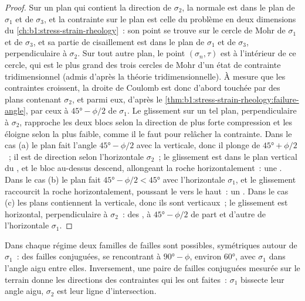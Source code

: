 \begin{proof}
Sur un plan qui contient la direction de $\sigma_2$, la normale est dans le
plan de $\sigma_1$ et de $\sigma_3$, et la contrainte sur le plan est celle du
problème en deux dimensions du \cref{ch:b1:stress-strain-rheology}~: son point
se trouve sur le cercle de Mohr de $\sigma_1$ et de $\sigma_3$, et sa partie de cisaillement est
dans le plan de $\sigma_1$ et de $\sigma_3$, perpendiculaire à $\sigma_2$. Sur tout
autre plan, le point $(\sigma_n, \tau)$ est à l'intérieur de ce cercle, qui est
le plus grand des trois cercles de Mohr d'un état de contrainte tridimensionnel
(admis d'après la théorie tridimensionnelle). À mesure que les contraintes croissent, la droite
de Coulomb est donc d'abord touchée par des plans contenant $\sigma_2$, et parmi
eux, d'après le \cref{thm:b1:stress-strain-rheology:failure-angle}, par ceux à
$\ang{45} - \phi/2$ de $\sigma_1$. Le glissement sur un tel plan, perpendiculaire à
$\sigma_2$, rapproche les deux blocs selon la direction de plus forte
compression et les éloigne selon la plus faible, comme il le faut pour relâcher la
contrainte. Dans le cas (a) le plan fait l'angle $\ang{45} - \phi/2$ avec la
verticale, donc il plonge de $\ang{45} + \phi/2$~; il est de direction selon l'horizontale
$\sigma_2$~; le glissement est dans le plan vertical du , et le bloc au-dessus
descend, allongeant la roche horizontalement~: une . Dans le cas (b) le
plan fait $\ang{45} - \phi/2 < \ang{45}$ avec l'horizontale $\sigma_1$, et
le glissement raccourcit la roche horizontalement, poussant le  vers le haut~: un
. Dans le cas (c) les plans contiennent la verticale, donc ils sont
verticaux~; le glissement est horizontal, perpendiculaire à $\sigma_2$~: des , à $\ang{45} - \phi/2$ de part et d'autre de l'horizontale $\sigma_1$.
\end{proof}

Dans chaque régime deux familles de failles sont possibles, symétriques autour de $\sigma_1$~:
des failles conjuguées, se rencontrant à $\ang{90} - \phi$, environ \ang{60}, avec
$\sigma_1$ dans l'angle aigu entre elles. Inversement, une paire de failles conjuguées
mesurée sur le terrain donne les directions des contraintes qui les ont faites~:
$\sigma_1$ bissecte leur angle aigu, $\sigma_2$ est leur ligne
d'intersection.


